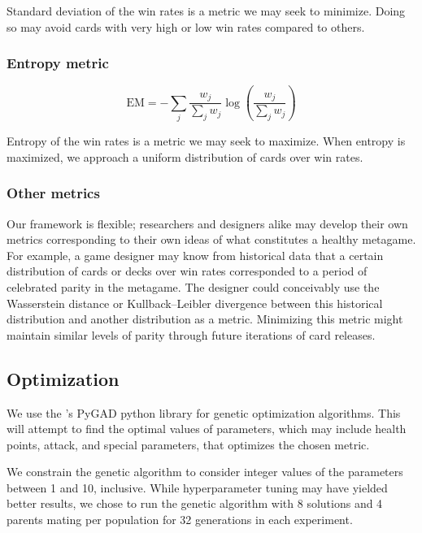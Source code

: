 Standard deviation of the win rates is a metric we may seek to minimize. Doing so may avoid cards with
very high or low win rates compared to others.

\subsubsection{Entropy metric}

\begin{equation}
	\mathrm{EM} = -\sum_j \frac{w_j}{\sum_j w_j} \log\left(\frac{w_j}{\sum_j w_j}\right)
\end{equation}

Entropy of the win rates is a metric we may seek to maximize. When entropy is maximized, we approach a uniform
distribution of cards over win rates.

\subsubsection{Other metrics} \label{sec:othermetrics}

Our framework is flexible; researchers and designers alike may develop their own metrics corresponding to their
own ideas of what constitutes a healthy metagame. For example, a game designer may know from historical data that
a certain distribution of cards or decks over win rates corresponded to a period of celebrated parity in the metagame. 
The designer could conceivably use the Wasserstein distance or Kullback--Leibler 
divergence between this historical distribution and another distribution as a metric. Minimizing this metric 
might maintain similar levels of parity through future iterations of card releases.

\subsection{Optimization} \label{sec:optimization}

We use the \citeauthor{gad2021pygad}'s  PyGAD python library for genetic optimization algorithms. This will attempt to find the optimal values of
parameters, which may include health points, attack, and special parameters, that optimizes
the chosen metric.

We constrain the genetic algorithm to consider integer values of the parameters between 1 and 10, inclusive. While hyperparameter tuning may have yielded better results,
we chose to run the genetic algorithm with 8 solutions and 4 parents mating per population for 32 generations in each experiment.

